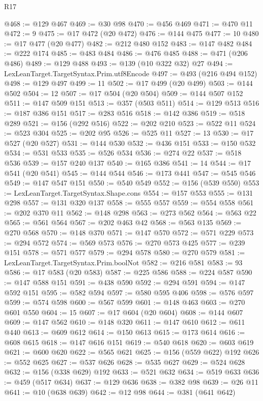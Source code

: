 \begin{lexlean}{R17}
\begin{coremodule}
@468 := @129 @467
@469 := @30 @98
@470 := @456 @469
@471 := @470 @11
@472 := 9
@475 := @17 @472 (@20 @472)
@476 := @144 @475
@477 := 10
@480 := @17 @477 (@20 @477)
@482 := @212 @480 @152
@483 := @147 @482
@484 := @222 @174
@485 := @483 @484
@486 := @476 @485
@488 := @471 (@206 @486)
@489 := @129 @488
@493 := @139 (@10 @322 @32) @27
@494 := LexLeanTarget.TargetSyntax.Prim.utf8Encode
@497 := @493 (@216 @494 @152)
@498 := @129 @497
@499 := 11
@502 := @17 @499 (@20 @499)
@503 := @144 @502
@504 := 12
@507 := @17 @504 (@20 @504)
@509 := @144 @507 @152
@511 := @147 @509 @151
@513 := @357 (@503 @511)
@514 := @129 @513
@516 := @187 @386 @151
@517 := @283 @516
@518 := @142 @386
@519 := @518 @289
@521 := @156 (@292 @516)
@522 := @202 @210
@523 := @522 @11
@524 := @523 @304
@525 := @202 @95
@526 := @525 @11
@527 := 13
@530 := @17 @527 (@20 @527)
@531 := @144 @530
@532 := @436 @151
@533 := @150 @532
@534 := @531 @533
@535 := @526 @534
@536 := @274 @22
@537 := @518 @536
@539 := @157 @240 @137
@540 := @165 @386
@541 := 14
@544 := @17 @541 (@20 @541)
@545 := @144 @544
@546 := @173 @441
@547 := @545 @546
@549 := @147 @547 @151
@550 := @540 @549
@552 := @156 (@539 @550)
@553 := LexLeanTarget.TargetSyntax.Shape.cons
@554 := @157 @553
@555 := @131 @298
@557 := @131 @320 @137
@558 := @555 @557
@559 := @554 @558
@561 := @202 @370 @11
@562 := @148 @298
@563 := @273 @562
@564 := @563 @22
@565 := @561 @564
@567 := @202 @463 @42
@568 := @563 @135
@569 := @270 @568
@570 := @148 @370
@571 := @147 @570
@572 := @571 @229
@573 := @294 @572
@574 := @569 @573
@576 := @270 @573 @425
@577 := @239 @151
@578 := @571 @577
@579 := @294 @578
@580 := @270 @579
@581 := LexLeanTarget.TargetSyntax.Prim.boolNot
@582 := @216 @581
@583 := 93
@586 := @17 @583 (@20 @583)
@587 := @225 @586
@588 := @224 @587
@590 := @147 @588 @151
@591 := @438 @590
@592 := @294 @591
@594 := @147 @592 @151
@595 := @582 @594
@597 := @580 @595 @406
@598 := @576 @597
@599 := @574 @598
@600 := @567 @599
@601 := @148 @463
@603 := @270 @601 @550
@604 := 15
@607 := @17 @604 (@20 @604)
@608 := @144 @607
@609 := @147 @562
@610 := @148 @320
@611 := @147 @610
@612 := @611 @440
@613 := @609 @612
@614 := @150 @613
@615 := @173 @614
@616 := @608 @615
@618 := @147 @616 @151
@619 := @540 @618
@620 := @603 @619
@621 := @600 @620
@622 := @565 @621
@625 := @156 (@559 @622) @192
@626 := @552 @625
@627 := @537 @626
@628 := @535 @627
@629 := @524 @628
@632 := @156 (@338 @629) @192
@633 := @521 @632
@634 := @519 @633
@636 := @459 (@517 @634)
@637 := @129 @636
@638 := @382 @98
@639 := @26 @11
@641 := @10 (@638 @639)
@642 := @12 @98
@644 := @381 (@641 @642)

\end{coremodule}
\end{lexlean}
